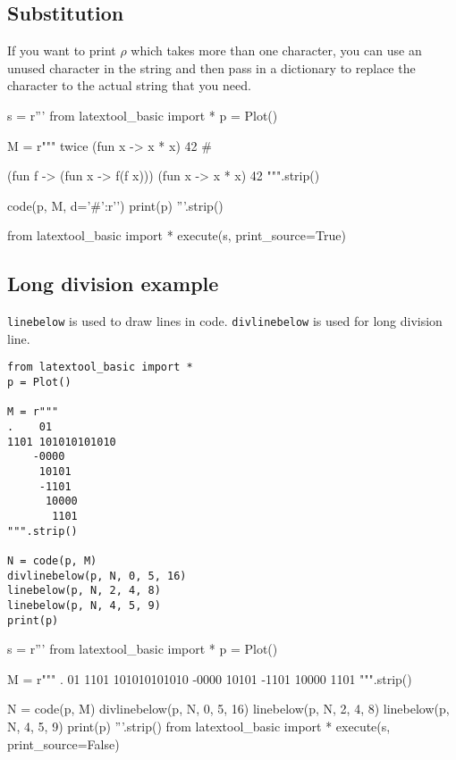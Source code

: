 \newpage
\subsection{Substitution}

If you want to print $\rho$ which takes more than
one character, you can use an unused character in the string and then
pass in a dictionary to replace the character to the actual
string that you need.

\begin{python}
s = r'''
from latextool_basic import *
p = Plot()

M = r"""
twice (fun x -> x * x) 42    #


(fun f -> (fun x -> f(f x))) (fun x -> x * x) 42
""".strip()

code(p, M, d={'#':r'\textred{$\rho$}'})
print(p)
'''.strip()

from latextool_basic import *
execute(s, print_source=True)
\end{python}

\newpage
\subsection{Long division example}

\verb!linebelow! is used to draw lines in code.
\verb!divlinebelow! is used for long division line.

\begin{Verbatim}[frame=single]
from latextool_basic import *
p = Plot()
    
M = r"""
.    01
1101 101010101010
    -0000
     10101
     -1101
      10000
       1101
""".strip()

N = code(p, M)
divlinebelow(p, N, 0, 5, 16)
linebelow(p, N, 2, 4, 8)
linebelow(p, N, 4, 5, 9)
print(p)
\end{Verbatim}

\begin{python}
s = r'''
from latextool_basic import *
p = Plot()

    
M = r"""
.    01
1101 101010101010
    -0000
     10101
     -1101
      10000
       1101
""".strip()

N = code(p, M)
divlinebelow(p, N, 0, 5, 16)
linebelow(p, N, 2, 4, 8)
linebelow(p, N, 4, 5, 9)
print(p)
'''.strip()
from latextool_basic import *
execute(s, print_source=False)
\end{python}
